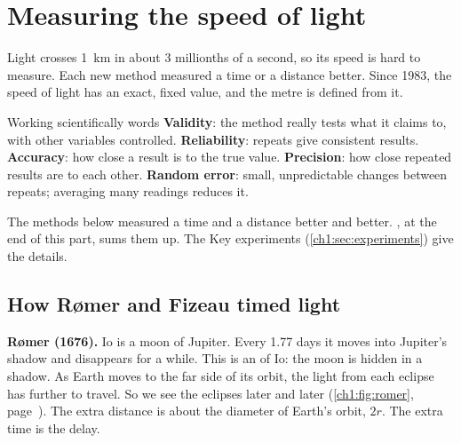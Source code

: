 \section{Measuring the speed of light}\label{ch1:sec:speed}

\begin{bigidea}
Light crosses \qty{1}{km} in about 3 millionths of a second, so its speed is hard to measure.
Each new method measured a time or a distance better. Since 1983, the speed of light has an
exact, fixed value, and the metre is defined from it.
\end{bigidea}

\begin{keywords}
\end{keywords}

\begin{refresher}{Working scientifically words}
\textbf{Validity}: the method really tests what it claims to, with other variables controlled.
\textbf{Reliability}: repeats give consistent results. \textbf{Accuracy}: how close a result is
to the true value. \textbf{Precision}: how close repeated results are to each other.
\textbf{Random error}: small, unpredictable changes between repeats; averaging many readings
reduces it.
\end{refresher}

The methods below measured a time and a distance better and better. , at
the end of this part, sums them up. The Key experiments (\cref{ch1:sec:experiments}) give the
details.

\subsection{How Rømer and Fizeau timed light}

\textbf{Rømer (1676).} Io is a moon of Jupiter. Every 1.77 days it moves into Jupiter's shadow
and disappears for a while. This is an  of Io: the moon is hidden in a shadow.
As Earth moves to the far side of its orbit, the light from each eclipse has further to travel.
So we see the eclipses later and later (\cref{ch1:fig:romer}, page~\pageref{ch1:fig:romer}). The
extra distance is about the diameter of Earth's orbit, $2r$. The extra time is the delay.

